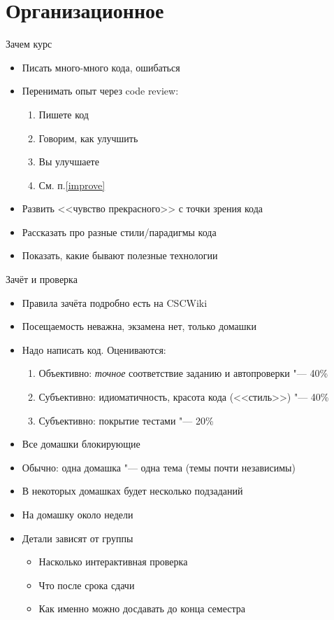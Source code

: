 \section{Организационное}
\begin{frame}[t]{Зачем курс}
	\begin{itemize}
		\item Писать много-много кода, ошибаться
		\item Перенимать опыт через code review:
			\begin{enumerate}
			\item Пишете код
			\item \label{improve} Говорим, как улучшить
			\item Вы улучшаете
			\item См. п.\ref{improve}
			\end{enumerate}
		\item Развить <<чувство прекрасного>> с точки зрения кода
		\item Рассказать про разные стили/парадигмы кода
		\item Показать, какие бывают полезные технологии
	\end{itemize}
\end{frame}

\begin{frame}[t]{Зачёт и проверка}
	\begin{itemize}
		\item Правила зачёта подробно есть на CSCWiki
		\item Посещаемость неважна, экзамена нет, только домашки
		\item Надо написать код. Оцениваются:
			\begin{enumerate}
			\item Объективно: \textit{точное} соответствие заданию и автопроверки "--- 40\%
			\item Субъективно: идиоматичность, красота кода (<<стиль>>) "--- 40\%
			\item Субъективно: покрытие тестами "--- 20\%
			\end{enumerate}
		\item Все домашки блокирующие
		\item Обычно: одна домашка "--- одна тема (темы почти независимы)
		\item В некоторых домашках будет несколько подзаданий
		\item На домашку около недели
		\item Детали зависят от группы
			\begin{itemize}
				\item Насколько интерактивная проверка
				\item Что после срока сдачи
				\item Как именно можно досдавать до конца семестра
			\end{itemize}
	\end{itemize}
\end{frame}

